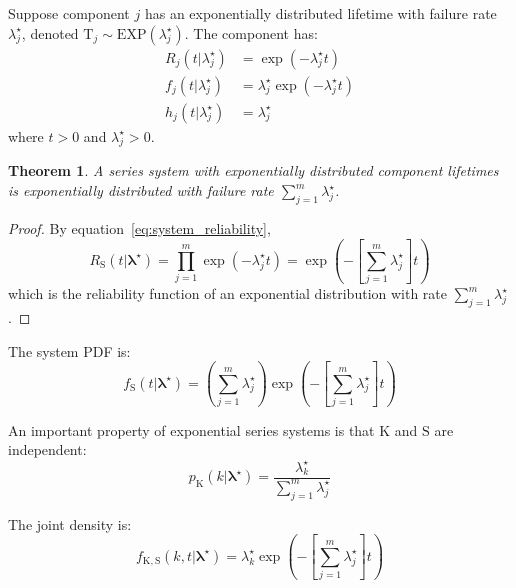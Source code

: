 \documentclass[12pt]{article}
\newcommand{\RV}[1]{\mathrm{#1}}
\newcommand{\cv}{\RV{T}}           %
\newcommand{\sv}{\RV{S}}           %
\newcommand{\tparam}[1]{{#1}^{\star}}  %
\newcommand{\pdf}{f}
\newcommand{\pmf}{p}
\newcommand{\srv}{R}
\newcommand{\haz}{h}
\newcommand{\spdf}{\pdf_{\sv}}
\newcommand{\expdist}{\mathrm{EXP}}
\renewcommand{\vec}[1]{\boldsymbol{#1}}
\newtheorem{theorem}{Theorem}[section]
\theoremstyle{definition}
\begin{document}
Suppose component $j$ has an exponentially distributed lifetime with failure rate $\tparam{\lambda}_j$, denoted $\cv_j \sim \expdist(\tparam{\lambda}_j)$. The component has:
\begin{align}
\label{eq:expo_reliability}
\srv_j(t | \tparam{\lambda}_j) &= \exp(-\tparam{\lambda}_j t)\\
\label{eq:expo_pdf}
\pdf_j(t | \tparam{\lambda}_j) &= \tparam{\lambda}_j \exp(-\tparam{\lambda}_j t)\\
\label{eq:expo_hazard}
\haz_j(t | \tparam{\lambda}_j) &= \tparam{\lambda}_j
\end{align}
where $t > 0$ and $\tparam{\lambda}_j > 0$.

\begin{theorem}
\label{thm:expo_system}
A series system with exponentially distributed component lifetimes is exponentially distributed with failure rate $\sum_{j=1}^{m} \tparam{\lambda}_j$.
\end{theorem}

\begin{proof}
By equation~\eqref{eq:system_reliability},
\begin{equation}
\srv_{\sv}(t | \tparam{\vec{\lambda}}) = \prod_{j=1}^{m} \exp(-\tparam{\lambda}_j t) = \exp\left(-\left[\sum_{j=1}^{m} \tparam{\lambda}_j\right] t\right)
\end{equation}
which is the reliability function of an exponential distribution with rate $\sum_{j=1}^{m} \tparam{\lambda}_j$.
\end{proof}

The system PDF is:
\begin{equation}
\label{eq:expo_system_pdf}
\spdf(t | \tparam{\vec{\lambda}}) = \left(\sum_{j=1}^{m} \tparam{\lambda}_j\right) \exp\left(-\left[\sum_{j=1}^{m} \tparam{\lambda}_j\right] t\right)
\end{equation}

An important property of exponential series systems is that $\RV{K}$ and $\sv$ are independent:
\begin{equation}
\label{eq:expo_K_indep_S}
\pmf_{\RV{K}}(k | \tparam{\vec{\lambda}}) = \frac{\tparam{\lambda}_k}{\sum_{j=1}^{m} \tparam{\lambda}_j}
\end{equation}

The joint density is:
\begin{equation}
\label{eq:expo_joint}
\pdf_{\RV{K}, \sv}(k, t | \tparam{\vec{\lambda}}) = \tparam{\lambda}_k \exp\left(-\left[\sum_{j=1}^{m} \tparam{\lambda}_j\right] t\right)
\end{equation}
\end{document}
